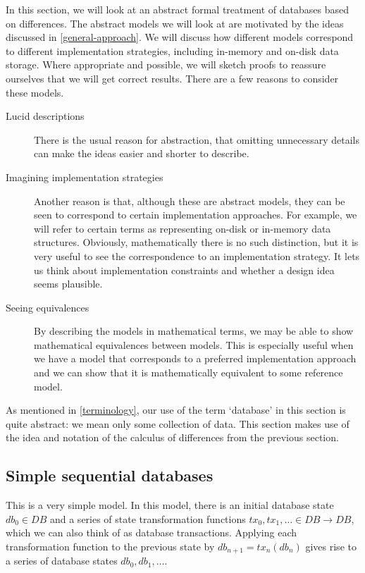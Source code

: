 \documentclass[11pt,a4paper]{article}
\begin{document}
In this section, we will look at an abstract formal treatment of databases based
on differences. The abstract models we will look at are motivated by the ideas
discussed in \cref{general-approach}. We will discuss how different models
correspond to different implementation strategies, including in-memory and
on-disk data storage. Where appropriate and possible, we will sketch proofs to
reassure ourselves that we will get correct results. There are a few reasons to
consider these models.
\begin{description}
\item[Lucid descriptions]
There is the usual reason for abstraction, that omitting unnecessary details can
make the ideas easier and shorter to describe.

\item[Imagining implementation strategies]
Another reason is that, although these are abstract models, they can be seen
to correspond to certain implementation approaches. For example, we will refer
to certain terms as representing on-disk or in-memory data structures. Obviously,
mathematically there is no such distinction, but it is very useful to see the
correspondence to an implementation strategy. It lets us think about
implementation constraints and whether a design idea seems plausible.

\item[Seeing equivalences]
By describing the models in mathematical terms, we may be able to show
mathematical equivalences between models. This is especially useful when we
have a model that corresponds to a preferred implementation approach and we
can show that it is mathematically equivalent to some reference model.
\end{description}
As mentioned in \cref{terminology}, our use of the term `database' in this
section is quite abstract: we mean only some collection of data. This section
makes use of the idea and notation of the calculus of differences from the
previous section.

\subsection{Simple sequential databases}
\label{simple-sequential-databases}

This is a very simple model. In this model, there is an initial database state
$\mathit{db}_0 \in \mathit{DB}$ and a series of state transformation functions
$\mathit{tx}_0, \mathit{tx}_1, \ldots \in \mathit{DB} \to \mathit{DB}$, which we can also think of as database
transactions. Applying each transformation function to the previous state by
$\mathit{db}_{n+1} = \mathit{tx}_n(\mathit{db}_n)$ gives rise to a series of database states
$\mathit{db}_0, \mathit{db}_1, \ldots$.
\end{document}
